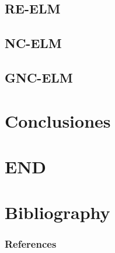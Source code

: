 \documentclass{beamer}
\begin{document}
\subsection{RE-ELM}
\subsection{NC-ELM}
\subsection{GNC-ELM}

\section{Conclusiones} %



\section*{END}

\section*{Bibliography}
\begin{frame}[allowframebreaks]
	\frametitle{References}
    
	
\end{frame}
\end{document}

